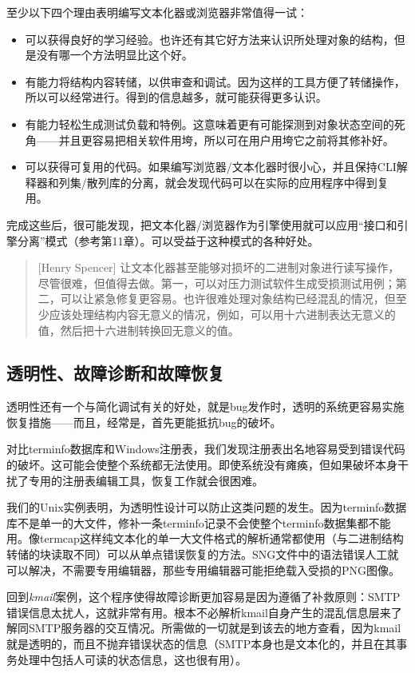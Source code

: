 \documentclass[12pt,oneside]{book}
\begin{document}
\begin{common-format}
至少以下四个理由表明编写文本化器或浏览器非常值得一试：
\begin{itemize}
\item 可以获得良好的学习经验。也许还有其它好方法来认识所处理对象的结构，但是没有哪一个方法明显比这个好。
\item 有能力将结构内容转储，以供审查和调试。因为这样的工具方便了转储操作，所以可以经常进行。得到的信息越多，就可能获得更多认识。
\item  有能力轻松生成测试负载和特例。这意味着更有可能探测到对象状态空间的死角——并且更容易把相关软件用垮，所以可在用户用垮它之前将其修补好。
\item 可以获得可复用的代码。如果编写浏览器/文本化器时很小心，并且保持CLI解释器和列集/散列库的分离，就会发现代码可以在实际的应用程序中得到复用。
\end{itemize}

完成这些后，很可能发现，把文本化器/浏览器作为引擎使用就可以应用“接口和引擎分离”模式（参考第11章）。可以受益于这种模式的各种好处。

\begin{quote}[Henry Spencer]
让文本化器甚至能够对损坏的二进制对象进行读写操作，尽管很难，但值得去做。第一，可以对压力测试软件生成受损测试用例；第二，可以让紧急修复更容易。也许很难处理对象结构已经混乱的情况，但至少应该处理结构内容无意义的情况，例如，可以用十六进制表达无意义的值，然后把十六进制转换回无意义的值。
\end{quote}


\subsection{透明性、故障诊断和故障恢复}
透明性还有一个与简化调试有关的好处，就是bug发作时，透明的系统更容易实施恢复措施——而且，经常是，首先更能抵抗bug的破坏。

对比terminfo数据库和Windows注册表，我们发现注册表出名地容易受到错误代码的破坏。这可能会使整个系统都无法使用。即使系统没有瘫痪，但如果破坏本身干扰了专用的注册表编辑工具，恢复工作就会很困难。

我们的Unix实例表明，为透明性设计可以防止这类问题的发生。因为terminfo数据库不是单一的大文件，修补一条terminfo记录不会使整个terminfo数据集都不能用。像termcap这样纯文本化的单一大文件格式的解析通常都使用（与二进制结构转储的块读取不同）可以从单点错误恢复的方法。SNG文件中的语法错误人工就可以解决，不需要专用编辑器，那些专用编辑器可能拒绝载入受损的PNG图像。

回到\textit{kmail}案例，这个程序使得故障诊断更加容易是因为遵循了补救原则：SMTP错误信息太扰人，这就非常有用。根本不必解析kmail自身产生的混乱信息层来了解同SMTP服务器的交互情况。所需做的一切就是到该去的地方查看，因为kmail就是透明的，而且不抛弃错误状态的信息（SMTP本身也是文本化的，并且在其事务处理中包括人可读的状态信息，这也很有用）。


\end{common-format}
\end{document}
